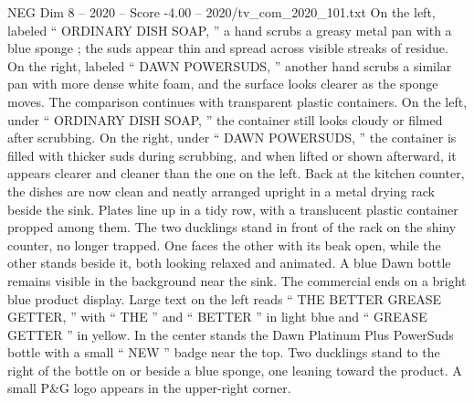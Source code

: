 \begin{textsample}{NEG Dim 8 – 2020 – Score -4.00 – 2020/tv\_com\_2020\_101.txt}
On the left, labeled “ ORDINARY DISH SOAP, ” a hand scrubs a greasy metal pan with a blue sponge ; the suds appear thin and spread across visible streaks of residue.
On the right, labeled “ DAWN POWERSUDS, ” another hand scrubs a similar pan with more dense white foam, and the surface looks clearer as the sponge moves.
The comparison continues with transparent plastic containers.
On the left, under “ ORDINARY DISH SOAP, ” the container still looks cloudy or filmed after scrubbing.
On the right, under “ DAWN POWERSUDS, ” the container is filled with thicker suds during scrubbing, and when lifted or shown afterward, it appears clearer and cleaner than the one on the left.
Back at the kitchen counter, the dishes are now clean and neatly arranged upright in a metal drying rack beside the sink.
Plates line up in a tidy row, with a translucent plastic container propped among them.
The two ducklings stand in front of the rack on the shiny counter, no longer trapped.
One faces the other with its beak open, while the other stands beside it, both looking relaxed and animated.
A blue Dawn bottle remains visible in the background near the sink.
The commercial ends on a bright blue product display.
Large text on the left reads “ THE BETTER GREASE GETTER, ” with “ THE ” and “ BETTER ” in light blue and “ GREASE GETTER ” in yellow.
In the center stands the Dawn Platinum Plus PowerSuds bottle with a small “ NEW ” badge near the top.
Two ducklings stand to the right of the bottle on or beside a blue sponge, one leaning toward the product.
A small P\&G logo appears in the upper-right corner.

\end{textsample}
